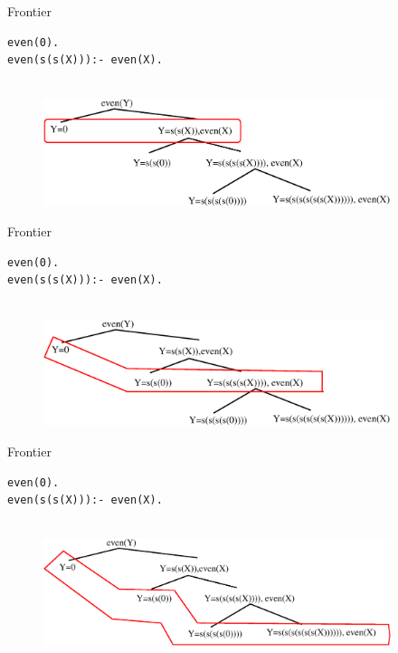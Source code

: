 \documentclass[pdf,slideColor,contemporain]{prosper}
\begin{document}
\begin{slide}{Frontier}
\begin{tiny}
{\blue
 \begin{verbatim}
even(0).
even(s(s(X))):- even(X).


 \end{verbatim}
}
\end{tiny}

\begin{figure}
        \centering
        \includegraphics[width=4in]{frontier1.eps} 
\end{figure}
\end{slide}

\begin{slide}{Frontier}
\begin{tiny}
{\blue
 \begin{verbatim}
even(0).
even(s(s(X))):- even(X).


 \end{verbatim}
}
\end{tiny}

\begin{figure}
        \centering
        \includegraphics[width=4in]{frontier2.eps} 
\end{figure}
\end{slide}

\begin{slide}{Frontier}
\begin{tiny}
{\blue
 \begin{verbatim}
even(0).
even(s(s(X))):- even(X).


 \end{verbatim}
}
\end{tiny}

\begin{figure}
        \centering
        \includegraphics[width=4in]{frontier3.eps} 
\end{figure}
\end{slide}
\end{document}
